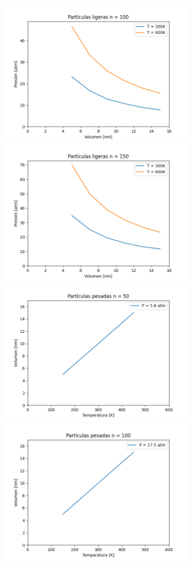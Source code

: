 \documentclass[]{article}
\begin{document}
\begin{figure}[H]
\begin{subfigure}
    	\end{subfigure}
    	\begin{subfigure}
    		\raggedright
    		\includegraphics[width=8cm, height=6cm]{graficos/grafico5.pdf}
    	\end{subfigure}
    	\begin{subfigure}
    		\raggedright
    		\includegraphics[width=8cm, height=6cm]{graficos/grafico6.pdf}
    	\end{subfigure}
    	\begin{subfigure}
    		\raggedright
    		\includegraphics[width=8cm, height=6cm]{graficos/grafico7.pdf}
    	\end{subfigure}
    	\begin{subfigure}
    		\raggedright
    		\includegraphics[width=8cm, height=6cm]{graficos/grafico8.pdf}
    	\end{subfigure}
\end{figure}   
\end{document}
